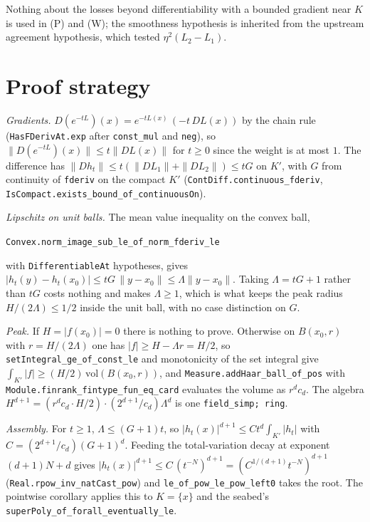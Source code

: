 \documentclass[11pt]{article}
\newcommand{\code}[1]{\texttt{#1}}
\begin{document}
Nothing about the losses beyond differentiability with a bounded gradient
near $K$ is used in (P) and (W); the smoothness hypothesis is inherited
from the upstream agreement hypothesis, which tested $\eta^2(L_2 - L_1)$.

\section{Proof strategy}

\emph{Gradients.} $D(e^{-tL})(x) = e^{-tL(x)}\,(-t\,DL(x))$ by the chain
rule (\code{HasFDerivAt.exp} after \code{const\_mul} and \code{neg}), so
$\|D(e^{-tL})(x)\| \le t\|DL(x)\|$ for $t \ge 0$ since the weight is at
most $1$. The difference has $\|Dh_t\| \le t(\|DL_1\| + \|DL_2\|) \le tG$
on $K'$, with $G$ from continuity of \code{fderiv} on the compact $K'$
(\code{ContDiff.continuous\_fderiv}, \code{IsCompact.exists\_bound\_of\_continuousOn}).

\emph{Lipschitz on unit balls.} The mean value inequality on the convex
ball,
\begin{center}\code{Convex.norm\_image\_sub\_le\_of\_norm\_fderiv\_le}\end{center}
with \code{DifferentiableAt} hypotheses, gives $|h_t(y) - h_t(x_0)| \le
tG\,\|y - x_0\| \le \Lambda\|y - x_0\|$. Taking $\Lambda = tG + 1$ rather
than $tG$ costs nothing and makes $\Lambda \ge 1$, which is what keeps
the peak radius $H/(2\Lambda) \le 1/2$ inside the unit ball, with no
case distinction on $G$.

\emph{Peak.} If $H = |f(x_0)| = 0$ there is nothing to prove. Otherwise
on $B(x_0, r)$ with $r = H/(2\Lambda)$ one has $|f| \ge H - \Lambda r =
H/2$, so \code{setIntegral\_ge\_of\_const\_le} and monotonicity of the
set integral give $\int_{K'}|f| \ge (H/2)\,\mathrm{vol}(B(x_0,r))$, and
\code{Measure.addHaar\_ball\_of\_pos} with
\code{Module.finrank\_fintype\_fun\_eq\_card} evaluates the volume as
$r^d c_d$. The algebra $H^{d+1} = (r^d c_d \cdot H/2)\cdot(2^{d+1}/c_d)
\Lambda^d$ is one \code{field\_simp; ring}.

\emph{Assembly.} For $t \ge 1$, $\Lambda \le (G+1)t$, so $|h_t(x)|^{d+1}
\le C t^d \int_{K'}|h_t|$ with $C = (2^{d+1}/c_d)(G+1)^d$. Feeding the
total-variation decay at exponent $(d+1)N + d$ gives $|h_t(x)|^{d+1} \le
C\,(t^{-N})^{d+1} = (C^{1/(d+1)} t^{-N})^{d+1}$
(\code{Real.rpow\_inv\_natCast\_pow}) and
\code{le\_of\_pow\_le\_pow\_left0} takes the root. The pointwise corollary
applies this to $K = \{x\}$ and the seabed's
\code{superPoly\_of\_forall\_eventually\_le}.
\end{document}
